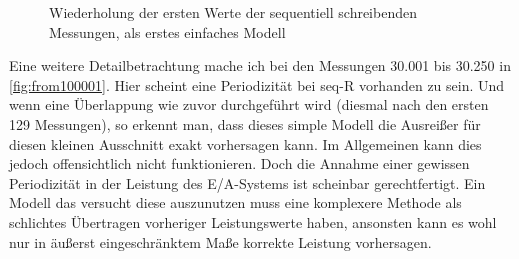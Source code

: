 \documentclass[
	12pt,
	a4paper,
	BCOR10mm,
	DIV14,
	listof=totoc,
	bibliography=totoc,
	headsepline
]{scrreprt}
\begin{document}
\begin{figure}
	\caption{Wiederholung der ersten Werte der sequentiell schreibenden Messungen, als erstes einfaches Modell}
	\label{fig:periodicity}
\end{figure} 

Eine weitere Detailbetrachtung mache ich bei den Messungen 30.001 bis 30.250 in \ref{fig:from100001}.
Hier scheint eine Periodizität bei seq-R vorhanden zu sein. Und wenn eine Überlappung wie zuvor durchgeführt wird (diesmal nach den ersten 129 Messungen), so erkennt man, dass dieses simple Modell die Ausreißer für diesen kleinen Ausschnitt exakt vorhersagen kann.
Im Allgemeinen kann dies jedoch offensichtlich nicht funktionieren.
Doch die Annahme einer gewissen Periodizität in der Leistung des E/A-Systems ist scheinbar gerechtfertigt. Ein Modell das versucht diese auszunutzen muss eine komplexere Methode als schlichtes Übertragen vorheriger Leistungswerte haben, ansonsten kann es wohl nur in äußerst eingeschränktem Maße korrekte Leistung vorhersagen.
\end{document}

